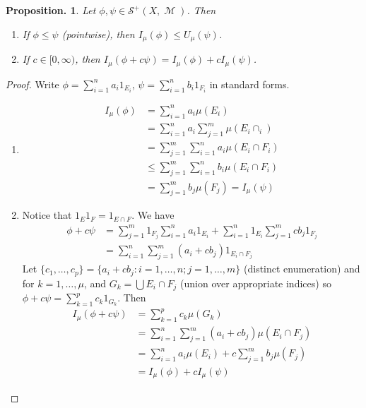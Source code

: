 \documentclass[11pt, a4paper]{memoir}
\theoremstyle{change}
\newtheorem{proposition}[theorem]{Proposition.}
\theoremstyle{plain}
\theoremstyle{nonumberplain}
\newtheorem{proof}{Proof}
\DeclareMathOperator{\M}{{\mathcal{M}}}
\begin{document}
\begin{proposition}
    Let $\phi,\psi\in\mathcal{S}^+(X,\M)$.
    Then
    \begin{enumerate}[nolistsep,label=(\roman*)]
        \item If $\phi\leq\psi$ (pointwise), then $I_\mu(\phi)\leq U_\mu(\psi)$.
        \item If $c\in[0,\infty)$, then $I_\mu(\phi+c\psi)=I_\mu(\phi)+cI_\mu(\psi)$.
    \end{enumerate}
\end{proposition}
\begin{proof}
    Write $\phi=\sum_{i=1}^n a_i1_{E_i}$, $\psi=\sum_{i=1}^n b_i1_{F_i}$ in standard forms.
    \begin{enumerate}[nolistsep,label=(\roman*)]
        \item
            \begin{align*}
                I_\mu(\phi) &= \sum\limits_{i=1}^na_i\mu(E_i)\\
                            &=\sum\limits_{i=1}^n a_i\sum\limits_{j=1}^m \mu(E_i\cap _i)\\
                            &=\sum\limits_{j=1}^m\sum\limits_{i=1}^na_i\mu(E_i\cap F_i)\\
                            &\leq \sum\limits_{j=1}^m\sum\limits_{i=1}^n b_i\mu(E_i\cap F_i)\\
                            &= \sum\limits_{j=1}^m b_j\mu(F_j)=I_\mu(\psi)
            \end{align*}
        \item Notice that $1_E1_F=1_{E\cap F}$.
            We have
            \begin{align*}
                \phi+c\psi&=\sum\limits_{j=1}^m 1_{F_j}\sum\limits_{i=1}^n a_i1_{E_i}+\sum\limits_{i=1}^n 1_{E_i}\sum\limits_{j=1}^m cb_j1_{F_j}\\
                          &=\sum\limits_{i=1}^n\sum\limits_{j=1}^m(a_i+cb_j)1_{E_i\cap F_j}
            \end{align*}
            Let $\{c_1,\ldots,c_p\}=\{a_i+cb_j:i=1,\ldots,n;j=1,\ldots,m\}$ (distinct enumeration) and for $k=1,\ldots,\mu$, and $G_k=\bigcup E_i\cap F_j$ (union over appropriate indices) so $\phi+c\psi=\sum_{k=1}^p c_k 1_{G_k}$.
            Then
            \begin{align*}
                I_\mu(\phi+c\psi)&=\sum\limits_{k=1}^p c_k\mu(G_k)\\
                                 &=\sum\limits_{i=1}^n\sum\limits_{j=1}^m (a_i+cb_j)\mu(E_i\cap F_j)\\
                                 &= \sum\limits_{i=1}^n a_i\mu(E_i)+c\sum\limits_{j=1}^m b_j\mu(F_j)\\
                                 &= I_\mu(\phi)+cI_\mu(\psi)
            \end{align*}
    \end{enumerate}
\end{proof}
\end{document}
